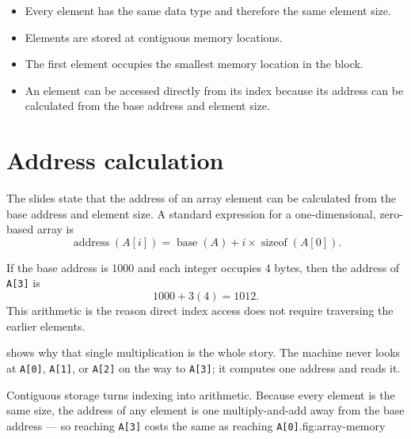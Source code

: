 \begin{itemize}
  \item Every element has the same data type and therefore the same element size.
  \item Elements are stored at contiguous memory locations.
  \item The first element occupies the smallest memory location in the block.
  \item An element can be accessed directly from its index because its address can be calculated from the base address and element size.
\end{itemize}

\section{Address calculation}

The slides state that the address of an array element can be calculated from the base address and element size. A standard expression for a one-dimensional, zero-based array is
\[
\operatorname{address}(A[i]) = \operatorname{base}(A) + i \times \operatorname{sizeof}(A[0]).
\]

\begin{workedexample}
If the base address is 1000 and each integer occupies 4 bytes, then the address of \texttt{A[3]} is
\[
1000 + 3(4) = 1012.
\]
This arithmetic is the reason direct index access does not require traversing the earlier elements.
\end{workedexample}

 shows why that single multiplication is the whole story. The
machine never looks at \texttt{A[0]}, \texttt{A[1]}, or \texttt{A[2]} on the way to
\texttt{A[3]}; it computes one address and reads it.

\begin{utpfig}{Contiguous storage turns indexing into arithmetic. Because every element is
the same size, the address of any element is one multiply-and-add away from the base
address --- so reaching \texttt{A[3]} costs the same as reaching
\texttt{A[0]}.}{fig:array-memory}
\end{utpfig}


